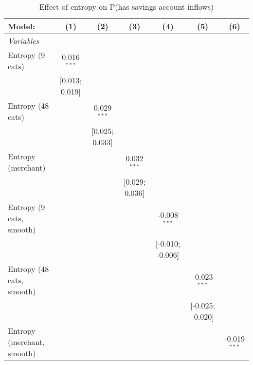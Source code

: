 
\begin{table}[htbp]
   \centering
   \tiny
   \begin{threeparttable}[b]
      \caption{\label{tab:reg_has_inflows_nolag} Effect of entropy on P(has savings account inflows)}
      \begin{tabular}{lcccccc}
         \tabularnewline \midrule \midrule
         Model:                     & (1)             & (2)             & (3)             & (4)              & (5)              & (6)\\  
         \midrule
         \emph{Variables}\\
         Entropy (9 cats)           & 0.016$^{***}$   &                 &                 &                  &                  &   \\   
                                    & [0.013; 0.019]  &                 &                 &                  &                  &   \\   
         Entropy (48 cats)          &                 & 0.029$^{***}$   &                 &                  &                  &   \\   
                                    &                 & [0.025; 0.033]  &                 &                  &                  &   \\   
         Entropy (merchant)         &                 &                 & 0.032$^{***}$   &                  &                  &   \\   
                                    &                 &                 & [0.029; 0.036]  &                  &                  &   \\   
         Entropy (9 cats, smooth)   &                 &                 &                 & -0.008$^{***}$   &                  &   \\   
                                    &                 &                 &                 & [-0.010; -0.006] &                  &   \\   
         Entropy (48 cats, smooth)  &                 &                 &                 &                  & -0.023$^{***}$   &   \\   
                                    &                 &                 &                 &                  & [-0.025; -0.020] &   \\   
         Entropy (merchant, smooth) &                 &                 &                 &                  &                  & -0.019$^{***}$\\   

\end{tabular}
\end{threeparttable}
\end{table}

